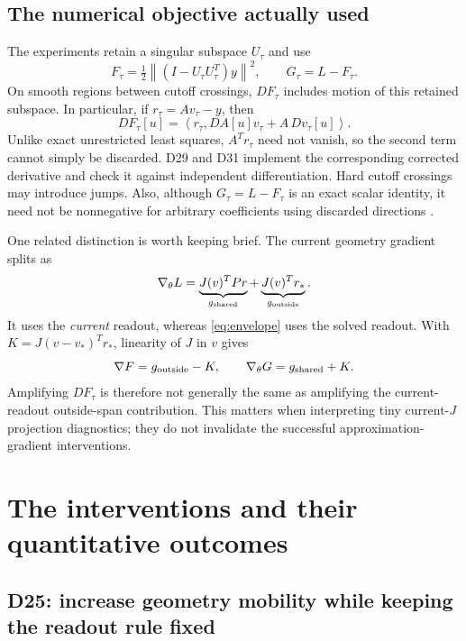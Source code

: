 \documentclass[11pt]{article}
\newcommand{\norm}[1]{\left\lVert#1\right\rVert}
\newcommand{\ip}[2]{\left\langle#1,#2\right\rangle}
\begin{document}
\subsection{The numerical objective actually used}

The experiments retain a singular subspace $U_\tau$ and use
\begin{equation}
 F_\tau=\tfrac12\norm{(I-U_\tau U_\tau^T)y}^2,\qquad
 G_\tau=L-F_\tau.
 \label{eq:numerical-profile}
\end{equation}
On smooth regions between cutoff crossings, $DF_\tau$ includes motion of this retained subspace. In particular, if $r_\tau=Av_\tau-y$, then
\begin{equation}
 DF_\tau[u]=\ip{r_\tau}{DA[u]v_\tau+A\,Dv_\tau[u]}.
\end{equation}
Unlike exact unrestricted least squares, $A^Tr_\tau$ need not vanish, so the second term cannot simply be discarded. D29 and D31 implement the corresponding corrected derivative and check it against independent differentiation. Hard cutoff crossings may introduce jumps. Also, although $G_\tau=L-F_\tau$ is an exact scalar identity, it need not be nonnegative for arbitrary coefficients using discarded directions \cite{projection,D29,D31}.

One related distinction is worth keeping brief. The current geometry gradient splits as
\begin{equation}
 \nabla_\theta L=
 \underbrace{J(v)^TPr}_{g_{\rm shared}}+
 \underbrace{J(v)^Tr_*}_{g_{\rm outside}}.
\end{equation}
It uses the \emph{current} readout, whereas \eqref{eq:envelope} uses the solved readout. With $K=J(v-v_*)^Tr_*$, linearity of $J$ in $v$ gives
\begin{equation}
 \nabla F=g_{\rm outside}-K,\qquad
 \nabla_\theta G=g_{\rm shared}+K.
\end{equation}
Amplifying $DF_\tau$ is therefore not generally the same as amplifying the current-readout outside-span contribution. This matters when interpreting tiny current-$J$ projection diagnostics; they do not invalidate the successful approximation-gradient interventions.

\section{The interventions and their quantitative outcomes}

\subsection{D25: increase geometry mobility while keeping the readout rule fixed}
\end{document}
